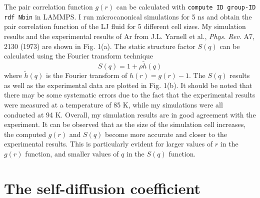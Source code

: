 \documentclass{article}
\begin{document}
The pair correlation function $g(r)$ can be calculated with \verb|compute ID group-ID rdf Nbin| in LAMMPS. I run microcanonical simulations for 5 ns and obtain the pair correlation function of the LJ fluid for 5 different cell sizes. My simulation results and the experimental results of Ar from J.L. Yarnell et al., {\it Phys. Rev}. A7, 2130 (1973) are shown in Fig. 1(a). The static structure factor $S(q)$ can be calculated using the Fourier transform technique
\begin{equation}
    S(q) = 1 + \rho \tilde{h}(q)
\end{equation}
where $\tilde{h}(q)$ is the Fourier transform of $h(r) = g(r) - 1$. The $S(q)$ results as well as the experimental data are plotted in Fig. 1(b). It should be noted that there may be some systematic errors due to the fact that the experimental results were measured at a temperature of 85 K, while my simulations were all conducted at 94 K. Overall, my simulation results are in good agreement with the experiment. It can be observed that as the size of the simulation cell increases, the computed $g(r)$ and $S(q)$ become more accurate and closer to the experimental results. This is particularly evident for larger values of $r$ in the $g(r)$ function, and smaller values of $q$ in the $S(q)$ function.

\section{The self-diffusion coefficient}
\end{document}
